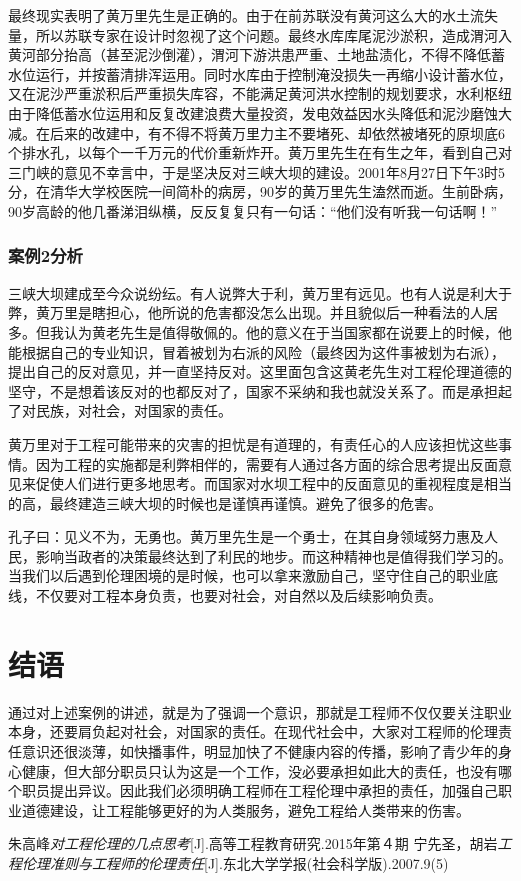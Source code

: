 \documentclass[a4paper,12pt]{ctexart}
\begin{document}
最终现实表明了黄万里先生是正确的。由于在前苏联没有黄河这么大的水土流失量，所以苏联专家在设计时忽视了这个问题。最终水库库尾泥沙淤积，造成渭河入黄河部分抬高（甚至泥沙倒灌），渭河下游洪患严重、土地盐渍化，不得不降低蓄水位运行，并按蓄清排浑运用。同时水库由于控制淹没损失一再缩小设计蓄水位，又在泥沙严重淤积后严重损失库容，不能满足黄河洪水控制的规划要求，水利枢纽由于降低蓄水位运用和反复改建浪费大量投资，发电效益因水头降低和泥沙磨蚀大减。在后来的改建中，有不得不将黄万里力主不要堵死、却依然被堵死的原坝底6个排水孔，以每个一千万元的代价重新炸开。黄万里先生在有生之年，看到自己对三门峡的意见不幸言中，于是坚决反对三峡大坝的建设。2001年8月27日下午3时5分，在清华大学校医院一间简朴的病房，90岁的黄万里先生溘然而逝。生前卧病，90岁高龄的他几番涕泪纵横，反反复复只有一句话：“他们没有听我一句话啊！”

\subsubsection{案例2分析}
三峡大坝建成至今众说纷纭。有人说弊大于利，黄万里有远见。也有人说是利大于弊，黄万里是瞎担心，他所说的危害都没怎么出现。并且貌似后一种看法的人居多。但我认为黄老先生是值得敬佩的。他的意义在于当国家都在说要上的时候，他能根据自己的专业知识，冒着被划为右派的风险（最终因为这件事被划为右派），提出自己的反对意见，并一直坚持反对。这里面包含这黄老先生对工程伦理道德的坚守，不是想着该反对的也都反对了，国家不采纳和我也就没关系了。而是承担起了对民族，对社会，对国家的责任。

黄万里对于工程可能带来的灾害的担忧是有道理的，有责任心的人应该担忧这些事情。因为工程的实施都是利弊相伴的，需要有人通过各方面的综合思考提出反面意见来促使人们进行更多地思考。而国家对水坝工程中的反面意见的重视程度是相当的高，最终建造三峡大坝的时候也是谨慎再谨慎。避免了很多的危害。

孔子曰：见义不为，无勇也。黄万里先生是一个勇士，在其自身领域努力惠及人民，影响当政者的决策最终达到了利民的地步。而这种精神也是值得我们学习的。当我们以后遇到伦理困境的是时候，也可以拿来激励自己，坚守住自己的职业底线，不仅要对工程本身负责，也要对社会，对自然以及后续影响负责。



\section{结语}

通过对上述案例的讲述，就是为了强调一个意识，那就是工程师不仅仅要关注职业本身，还要肩负起对社会，对国家的责任。在现代社会中，大家对工程师的伦理责任意识还很淡薄，如快播事件，明显加快了不健康内容的传播，影响了青少年的身心健康，但大部分职员只认为这是一个工作，没必要承担如此大的责任，也没有哪个职员提出异议。因此我们必须明确工程师在工程伦理中承担的责任，加强自己职业道德建设，让工程能够更好的为人类服务，避免工程给人类带来的伤害。

\begin{thebibliography}{99}

朱高峰\emph{对工程伦理的几点思考}[J].高等工程教育研究.2015年第４期
  宁先圣，胡岩\emph{工程伦理准则与工程师的伦理责任}[J].东北大学学报(社会科学版).2007.9(5)
  
\end{thebibliography}
\end{document}
